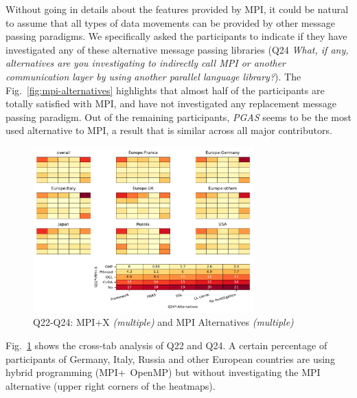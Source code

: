 \documentclass[preprint,5p,times]{elsarticle}
\def\myquote#1{{\it #1}}
\def\mcountries{major contributors\xspace{}}%
\begin{document}
Without going in details about the features provided by MPI, it could be natural
to assume that all types of data movements can be provided by other message
passing paradigms. We specifically asked the participants to indicate if they
have investigated any of these alternative message passing libraries (Q24
\myquote{What, if any, alternatives are you investigating to indirectly call MPI
or another communication layer by using another parallel language library?}).
The Fig.~\ref{fig:mpi-alternatives} highlights that almost half of the
participants are totally satisfied with MPI, and have not investigated any
replacement message passing paradigm. Out of the remaining participants,
\myquote{PGAS} seems to be the most used alternative to MPI, a result that is
similar across all \mcountries.


\begin{figure}[htb]
\begin{center}
\includegraphics[width=8.5cm]{Figs/Q22-Q24.pdf}
\caption{Q22-Q24: MPI+X {\it(multiple)} and MPI Alternatives {\it(multiple)}}
\label{fig:mpi-x-and-alternatives}
\end{center}
\end{figure}

Fig.~\ref{fig:mpi-x-and-alternatives} shows the cross-tab analysis of Q22 and
Q24. A certain percentage of participants of Germany, Italy, Russia and other
European countries are using hybrid programming (MPI+\ OpenMP) but without
investigating the MPI alternative (upper right corners of the heatmaps).
\end{document}
